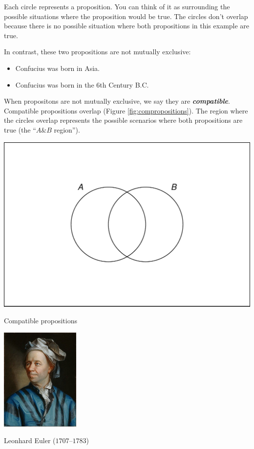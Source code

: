 \documentclass[justified]{tufte-book}
\providecommand{\tightlist}{%
  \setlength{\itemsep}{0pt}\setlength{\parskip}{0pt}}
\renewcommand{\wedge}{\mathbin{\&}}
\theoremstyle{definition}
\theoremstyle{definition}
\theoremstyle{definition}
\theoremstyle{remark}
\begin{document}
Each circle represents a proposition. You can think of it as surrounding
the possible situations where the proposition would be true. The circles
don't overlap because there is no possible situation where both
propositions in this example are true.

In contrast, these two propositions are not mutually exclusive:

\begin{itemize}
\tightlist
\item
  Confucius was born in Asia.
\item
  Confucius was born in the 6th Century B.C.
\end{itemize}

When propositons are not mutually exclusive, we say they are
\textbf{\emph{compatible}}. Compatible propositions overlap (Figure
\ref{fig:compropositions}). The region where the circles overlap
represents the possible scenarios where both propositions are true (the
``\(A \wedge B\) region'').

\begin{marginfigure}
\includegraphics{_main_files/figure-latex/compropositions-1} \caption[Compatible propositions]{Compatible propositions}\label{fig:compropositions}
\end{marginfigure}

\begin{marginfigure}
\includegraphics[width=1.54in]{img/euler} \caption[Leonhard Euler ($1707$--$1783$)]{Leonhard Euler ($1707$--$1783$)}\label{fig:unnamed-chunk-13}
\end{marginfigure}
\end{document}
